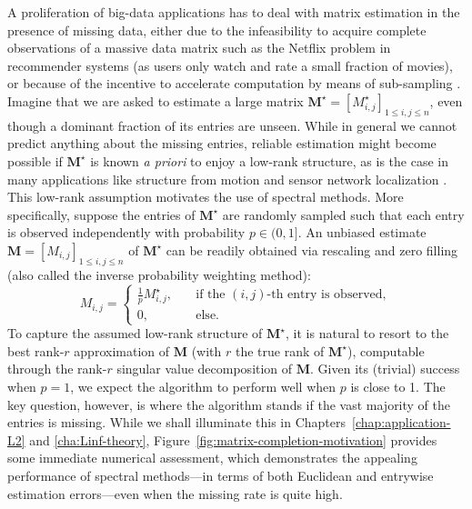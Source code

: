 A proliferation of big-data applications has to deal with matrix estimation in the presence of missing data,  either due to the infeasibility to acquire complete observations of a massive data matrix \citep{davenport2016overview} such as the Netflix problem in recommender systems (as users only watch and rate a small fraction of movies), or because of the incentive to accelerate computation by means of sub-sampling \citep{mahoney2016lecture}.
Imagine that we are asked to estimate a large matrix $\bm{M}^{\star}=[M_{i,j}^{\star}]_{1\leq i,j\leq n}$, even though a dominant fraction of its entries are unseen.  While in general we cannot  predict anything about the missing entries,  reliable estimation might become possible if $\bm{M}^{\star}$ is known {\em a priori} to enjoy a low-rank structure, as is the case in many applications like structure from motion \citep{tomasi1992shape} and sensor network localization \citep{javanmard2013localization}. This low-rank assumption motivates the use of spectral methods.  More specifically, suppose the entries of $\bm{M}^{\star}$ are randomly sampled such that each entry  is observed independently with probability $p \in (0,1]$. An unbiased estimate $\bm{M}=[M_{i,j}]_{1\leq i,j\leq n}$ of $\bm{M}^{\star}$ can be readily obtained via  rescaling and zero filling (also called the inverse probability weighting method):
%
\begin{equation*}
	M_{i,j}=\begin{cases}
\frac{1}{p}M_{i,j}^{\star},\quad & \text{if the }(i,j)\text{-th}\text{ entry is observed},\\
0, & \text{else}.
\end{cases}
\end{equation*}
%
To capture the assumed low-rank structure of $\bm{M}^{\star}$, it is natural to resort to the best rank-$r$ approximation of $\bm{M}$ (with $r$  the true rank of $\bm{M}^{\star}$),
computable through the rank-$r$ singular value decomposition of $\bm{M}$.  Given its (trivial) success when $p=1$,  we expect the algorithm  to perform well when  $p$ is close to 1.  The key question, however, is where the algorithm stands if the vast majority of the entries is missing.
While we shall illuminate this in Chapters~\ref{chap:application-L2} and \ref{cha:Linf-theory}, Figure~\ref{fig:matrix-completion-motivation} provides some immediate numerical assessment,
which demonstrates the appealing performance of spectral methods---in terms of both Euclidean and entrywise estimation errors---even when  the missing rate is quite high.





